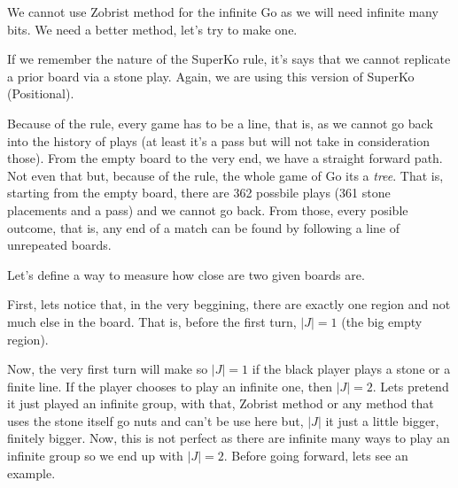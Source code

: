 We cannot use Zobrist method for the infinite Go as we will need infinite many bits. We need a better method, let's try to make one.

If we remember the nature of the SuperKo rule, it's says that we cannot replicate a prior board via a stone play. Again, we are using this version of SuperKo (Positional).

Because of the rule, every game has to be a line, that is, as we cannot go back into the history of plays (at least it's a pass but will not take in consideration those). From the empty board to the very end, we have a straight forward path. Not even that but, because of the rule, the whole game of Go its a \textit{tree}. That is, starting from the empty board, there are 362 possbile plays (361 stone placements and a pass) and we cannot go back. From those, every posible outcome, that is, any end of a match can be found by following a line of unrepeated boards.

Let's define a way to measure how close are two given boards are.

First, lets notice that, in the very beggining, there are exactly one region and not much else in the board. That is, before the first turn, $|J|=1$ (the big empty region).

Now, the  very first turn will make so $|J|=1$ if the black player plays a stone or a finite line. If the player chooses to play an infinite one, then $|J|=2$. Lets pretend it just played an infinite group, with that, Zobrist method or any method that uses the stone itself go nuts and can't be use here but, $|J|$ it just a little bigger, finitely bigger. Now, this is not perfect as there are infinite many ways to play an infinite group so we end up with $|J|=2$. Before going forward, lets see an example.

